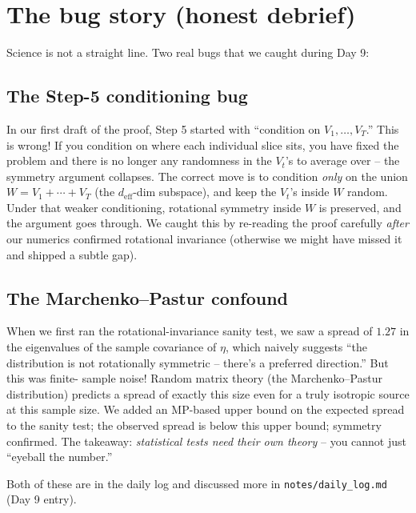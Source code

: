 \documentclass[11pt]{article}
\newcommand{\deff}{d_{\mathrm{eff}}}
\begin{document}
\section{The bug story (honest debrief)}\label{sec:bugs}

Science is not a straight line. Two real bugs that we caught during
Day 9:

\subsection{The Step-5 conditioning bug}

In our first draft of the proof, Step 5 started with ``condition on
$V_1, \dots, V_T$.'' This is wrong! If you condition on where each
individual slice sits, you have fixed the problem and there is no
longer any randomness in the $V_t$'s to average over -- the symmetry
argument collapses. The correct move is to condition \emph{only} on
the union $W = V_1 + \cdots + V_T$ (the $\deff$-dim subspace), and
keep the $V_t$'s inside $W$ random. Under that weaker conditioning,
rotational symmetry inside $W$ is preserved, and the argument goes
through. We caught this by re-reading the proof carefully \emph{after}
our numerics confirmed rotational invariance (otherwise we might have
missed it and shipped a subtle gap).

\subsection{The Marchenko--Pastur confound}

When we first ran the rotational-invariance sanity test, we saw a
spread of $1.27$ in the eigenvalues of the sample covariance of
$\eta$, which naively suggests ``the distribution is not rotationally
symmetric -- there's a preferred direction.'' But this was finite-
sample noise! Random matrix theory (the Marchenko--Pastur
distribution) predicts a spread of exactly this size even for a truly
isotropic source at this sample size. We added an MP-based upper bound
on the expected spread to the sanity test; the observed spread is
below this upper bound; symmetry confirmed. The takeaway:
\emph{statistical tests need their own theory} -- you cannot just
``eyeball the number.''

Both of these are in the daily log and discussed more in
\texttt{notes/daily\_log.md} (Day 9 entry).

\end{document}
